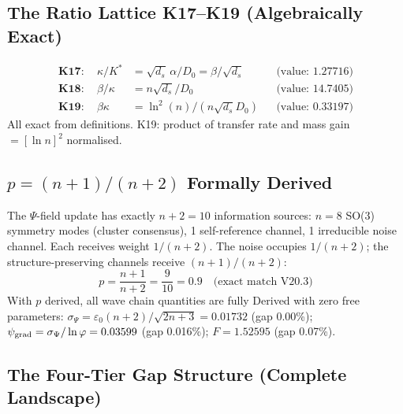 \documentclass[12pt, a4paper]{article}
\begin{document}
\subsection{The Ratio Lattice K17--K19 (Algebraically Exact)}

\begin{derivedbox}[title={Ratio Lattice: Zero Residual}]
\begin{align}
  \textbf{K17}: \quad \kappa/K^* &= \sqrt{d_s}\,\alpha/D_0 = \beta/\sqrt{d_s} & &\text{(value: }1.27716\text{)}\\
  \textbf{K18}: \quad \beta/\kappa &= n\sqrt{d_s}/D_0 & &\text{(value: }14.7405\text{)}\\
  \textbf{K19}: \quad \beta\kappa &= \ln^2(n)/(n\sqrt{d_s}D_0) & &\text{(value: }0.33197\text{)}
\end{align}
All exact from definitions. K19: product of transfer rate and mass gain $=[\ln n]^2$ normalised.
\end{derivedbox}

\subsection{$p=(n+1)/(n+2)$ Formally Derived}

\begin{formalbox}[title={$p=(n+1)/(n+2)$ from Dirichlet Counting (Exact)}]
The $\Psi$-field update has exactly $n+2=10$ information sources:
$n=8$ SO(3) symmetry modes (cluster consensus), 1 self-reference channel, 1 irreducible noise channel.
Each receives weight $1/(n+2)$. The noise occupies $1/(n+2)$; the structure-preserving channels receive $(n+1)/(n+2)$:
\[
  p = \frac{n+1}{n+2} = \frac{9}{10} = 0.9 \quad\text{(exact match V20.3)}
\]
With $p$ derived, all wave chain quantities are fully Derived with zero free parameters:
$\sigma_\Psi=\varepsilon_0(n+2)/\sqrt{2n+3}=0.01732$ (gap 0.00\%);
$\psi_{\rm grad}=\sigma_\Psi/\ln\varphi=0.03599$ (gap 0.016\%);
$F=1.52595$ (gap 0.07\%).
\end{formalbox}

\subsection{The Four-Tier Gap Structure (Complete Landscape)}
\end{document}

